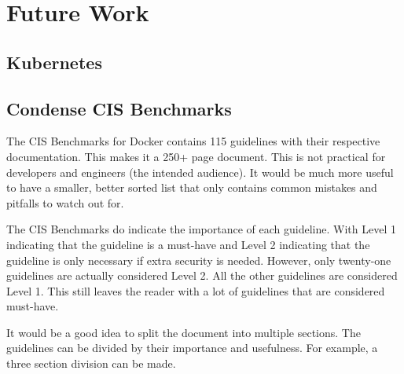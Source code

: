 \chapter{Future Work}
\section{Kubernetes}


\hfill


\section{Condense CIS Benchmarks}

The CIS Benchmarks for Docker contains 115 guidelines with their respective documentation.
This makes it a 250+ page document. This is not practical for developers and engineers (the intended audience). It would be much more useful to have a smaller, better sorted list that only contains common mistakes and pitfalls to watch out for.

\hfill

The CIS Benchmarks do indicate the importance of each guideline.
With Level 1 indicating that the guideline is a must-have and Level 2 indicating that the guideline is only necessary if extra security is needed. However, only twenty-one guidelines are actually considered Level 2. All the other guidelines are considered Level 1. This still leaves the reader with a lot of guidelines that are considered must-have.

\hfill

It would be a good idea to split the document into multiple sections. The guidelines can be divided by their importance and usefulness. For example, a three section division can be made.


